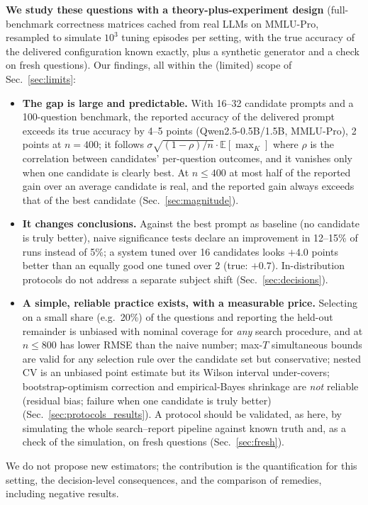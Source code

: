 \textbf{We study these questions with a theory-plus-experiment design} (full-benchmark correctness matrices cached from real LLMs on MMLU-Pro, resampled to simulate $10^3$ tuning episodes per setting, with the true accuracy of the delivered configuration known exactly, plus a synthetic generator and a check on fresh questions).
Our findings, all within the (limited) scope of Sec.~\ref{sec:limits}:
\begin{itemize}[leftmargin=1.2em,itemsep=0pt,topsep=2pt]
\item \textbf{The gap is large and predictable.} With 16--32 candidate prompts and a 100-question benchmark, the reported accuracy of the delivered prompt exceeds its true accuracy by 4--5 points (Qwen2.5-0.5B/1.5B, MMLU-Pro), 2 points at $n{=}400$; it follows $\sigma\sqrt{(1-\rho)/n}\cdot\mathbb E[\max_K]$ where $\rho$ is the correlation between candidates' per-question outcomes, and it vanishes only when one candidate is clearly best. At $n\le400$ at most half of the reported gain over an average candidate is real, and the reported gain always exceeds that of the best candidate (Sec.~\ref{sec:magnitude}).
\item \textbf{It changes conclusions.} Against the best prompt as baseline (no candidate is truly better), naive significance tests declare an improvement in 12--15\% of runs instead of 5\%; a system tuned over 16 candidates looks $+4.0$ points better than an equally good one tuned over 2 (true: $+0.7$). In-distribution protocols do not address a separate subject shift (Sec.~\ref{sec:decisions}).
\item \textbf{A simple, reliable practice exists, with a measurable price.} Selecting on a small share (e.g.\ 20\%) of the questions and reporting the held-out remainder is unbiased with nominal coverage for \emph{any} search procedure, and at $n\le800$ has lower RMSE than the naive number; max-$T$ simultaneous bounds are valid for any selection rule over the candidate set but conservative; nested CV is an unbiased point estimate but its Wilson interval under-covers; bootstrap-optimism correction and empirical-Bayes shrinkage are \emph{not} reliable (residual bias; failure when one candidate is truly better) (Sec.~\ref{sec:protocols_results}). A protocol should be validated, as here, by simulating the whole search--report pipeline against known truth and, as a check of the simulation, on fresh questions (Sec.~\ref{sec:fresh}).
\end{itemize}
We do not propose new estimators; the contribution is the quantification for this setting, the decision-level consequences, and the comparison of remedies, including negative results.
